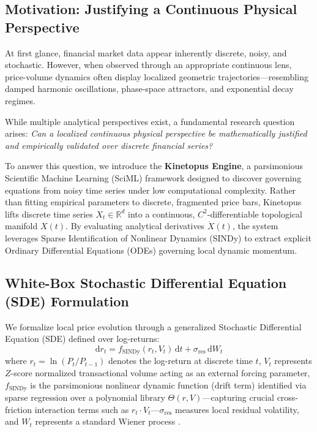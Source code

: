 \documentclass[11pt,a4paper]{article}
\begin{document}
\subsection{Motivation: Justifying a Continuous Physical Perspective}

At first glance, financial market data appear inherently discrete, noisy, and stochastic. However, when observed through an appropriate continuous lens, price-volume dynamics often display localized geometric trajectories---resembling damped harmonic oscillations, phase-space attractors, and exponential decay regimes. 

While multiple analytical perspectives exist, a fundamental research question arises: \textit{Can a localized continuous physical perspective be mathematically justified and empirically validated over discrete financial series?}

To answer this question, we introduce the \textbf{Kinetopus Engine}, a parsimonious Scientific Machine Learning (SciML) framework designed to discover governing equations from noisy time series under low computational complexity. Rather than fitting empirical parameters to discrete, fragmented price bars, Kinetopus lifts discrete time series $X_t \in \mathbb{R}^d$ into a continuous, $C^2$-differentiable topological manifold $X(t)$. By evaluating analytical derivatives $\dot{X}(t)$, the system leverages Sparse Identification of Nonlinear Dynamics (SINDy) \cite{brunton2016discovering, champion2019data} to extract explicit Ordinary Differential Equations (ODEs) governing local dynamic momentum.

\subsection{White-Box Stochastic Differential Equation (SDE) Formulation}

We formalize local price evolution through a generalized Stochastic Differential Equation (SDE) defined over log-returns:
\begin{equation}
    \mathrm{d}r_t = f_{\text{SINDy}}(r_t, V_t) \, \mathrm{d}t + \sigma_{\text{res}} \, \mathrm{d}W_t
\end{equation}
where $r_t = \ln(P_t / P_{t-1})$ denotes the log-return at discrete time $t$, $V_t$ represents $Z$-score normalized transactional volume acting as an external forcing parameter, $f_{\text{SINDy}}$ is the parsimonious nonlinear dynamic function (drift term) identified via sparse regression over a polynomial library $\Theta(r, V)$---capturing crucial cross-friction interaction terms such as $r_t \cdot V_t$---$\sigma_{\text{res}}$ measures local residual volatility, and $W_t$ represents a standard Wiener process \cite{kloeden1992numerical}.
\end{document}
